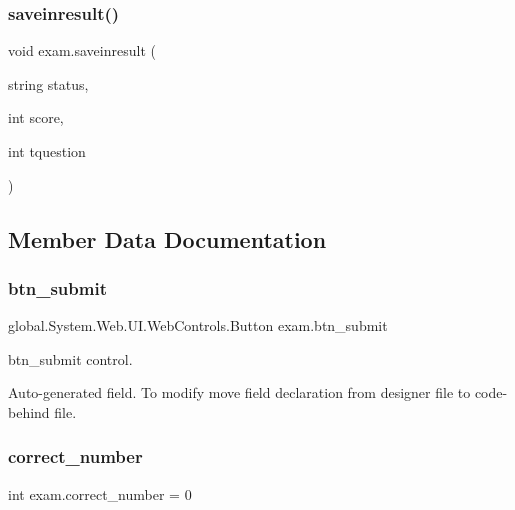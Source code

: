 \mbox{\label{classexam_a9d93630c053d5c62248a0f4361d585da}} 
\subsubsection{\texorpdfstring{saveinresult()}{saveinresult()}}
{\footnotesize\ttfamily void exam.\+saveinresult (\begin{DoxyParamCaption}\item[{string}]{status,  }\item[{int}]{score,  }\item[{int}]{tquestion }\end{DoxyParamCaption})}



\subsection{Member Data Documentation}
\mbox{\label{classexam_a90432d4b8869da31ab03a41740d7f725}} 
\subsubsection{\texorpdfstring{btn\_submit}{btn\_submit}}
{\footnotesize\ttfamily global.\+System.\+Web.\+U\+I.\+Web\+Controls.\+Button exam.\+btn\+\_\+submit\hspace{0.3cm}{\ttfamily [protected]}}



btn\+\_\+submit control. 

Auto-\/generated field. To modify move field declaration from designer file to code-\/behind file. \mbox{\label{classexam_af01ef9946fbf30e3762ab32c74c42176}} 
\subsubsection{\texorpdfstring{correct\_number}{correct\_number}}
{\footnotesize\ttfamily int exam.\+correct\+\_\+number = 0\hspace{0.3cm}{\ttfamily [private]}}

\mbox{\label{classexam_acd144f0582e8b0fdfc95e549d0f5f470}} 
